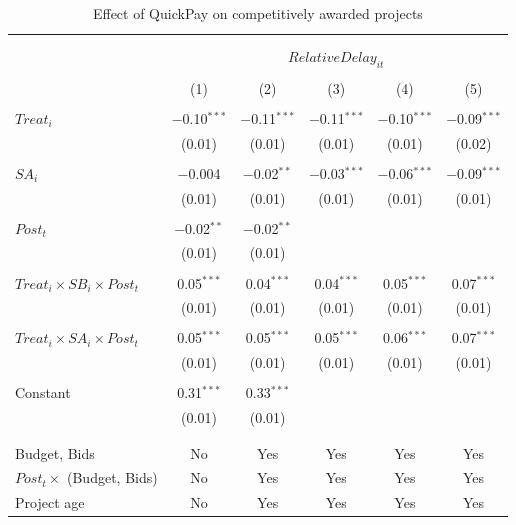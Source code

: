 \documentclass[
]{article}
\begin{document}
\begin{table}[H] \centering 
  \caption{Effect of QuickPay on competitively awarded projects} 
  \label{} 
\small 
\begin{tabular}{@{\extracolsep{-2pt}}lccccc} 
\\[-1.8ex]\hline 
\hline \\[-1.8ex] 
\\[-1.8ex] & \multicolumn{5}{c}{$RelativeDelay_{it}$  } \\ 
\\[-1.8ex] & (1) & (2) & (3) & (4) & (5)\\ 
\hline \\[-1.8ex] 
 $Treat_i$ & $-$0.10$^{***}$ & $-$0.11$^{***}$ & $-$0.11$^{***}$ & $-$0.10$^{***}$ & $-$0.09$^{***}$ \\ 
  & (0.01) & (0.01) & (0.01) & (0.01) & (0.02) \\ 
  & & & & & \\ 
 $SA_i$ & $-$0.004 & $-$0.02$^{**}$ & $-$0.03$^{***}$ & $-$0.06$^{***}$ & $-$0.09$^{***}$ \\ 
  & (0.01) & (0.01) & (0.01) & (0.01) & (0.01) \\ 
  & & & & & \\ 
 $Post_t$ & $-$0.02$^{**}$ & $-$0.02$^{**}$ &  &  &  \\ 
  & (0.01) & (0.01) &  &  &  \\ 
  & & & & & \\ 
 $Treat_i \times SB_i \times Post_t$ & 0.05$^{***}$ & 0.04$^{***}$ & 0.04$^{***}$ & 0.05$^{***}$ & 0.07$^{***}$ \\ 
  & (0.01) & (0.01) & (0.01) & (0.01) & (0.01) \\ 
  & & & & & \\ 
 $Treat_i \times SA_i \times Post_t$ & 0.05$^{***}$ & 0.05$^{***}$ & 0.05$^{***}$ & 0.06$^{***}$ & 0.07$^{***}$ \\ 
  & (0.01) & (0.01) & (0.01) & (0.01) & (0.01) \\ 
  & & & & & \\ 
 Constant & 0.31$^{***}$ & 0.33$^{***}$ &  &  &  \\ 
  & (0.01) & (0.01) &  &  &  \\ 
  & & & & & \\ 
\hline \\[-1.8ex] 
Budget, Bids & No & Yes & Yes & Yes & Yes \\ 
$Post_t \times $  (Budget, Bids) & No & Yes & Yes & Yes & Yes \\ 
Project age & No & Yes & Yes & Yes & Yes \\ 

\end{tabular}
\end{table}
\end{document}
